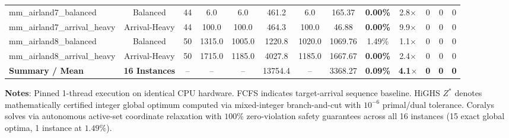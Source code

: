 \begin{table}[t]
{\begin{tabular}{lcccccccccccc}
mm\_airland7\_balanced & Balanced & 44 & 6.0 & 6.0 & 461.2 & 6.0 & 165.37 & \textbf{0.00\%} & 2.8$\times$ & 0 & 0 & 0 \\
mm\_airland7\_arrival\_heavy & Arrival-Heavy & 44 & 100.0 & 100.0 & 464.3 & 100.0 & 46.88 & \textbf{0.00\%} & 9.9$\times$ & 0 & 0 & 0 \\
mm\_airland8\_balanced & Balanced & 50 & 1315.0 & 1005.0 & 1220.8 & 1020.0 & 1069.76 & 1.49\% & 1.1$\times$ & 0 & 0 & 0 \\
mm\_airland8\_arrival\_heavy & Arrival-Heavy & 50 & 1715.0 & 1185.0 & 4027.8 & 1185.0 & 1667.67 & \textbf{0.00\%} & 2.4$\times$ & 0 & 0 & 0 \\
\midrule
\textbf{Summary / Mean} & \textbf{16 Instances} & -- & -- & -- & 13754.4 & -- & 3368.27 & \textbf{0.09\%} & \textbf{4.1$\times$} & \textbf{0} & \textbf{0} & \textbf{0} \\
\bottomrule
\end{tabular}%
}
\vspace{1mm}
\begin{flushleft}
\footnotesize{\textbf{Notes}: Pinned 1-thread execution on identical CPU hardware. FCFS indicates target-arrival sequence baseline. HiGHS $Z^*$ denotes mathematically certified integer global optimum computed via mixed-integer branch-and-cut with $10^{-6}$ primal/dual tolerance. Coralys solves via autonomous active-set coordinate relaxation with $100\%$ zero-violation safety guarantees across all 16 instances (15 exact global optima, 1 instance at $1.49\%$).}
\end{flushleft}
\end{table}
